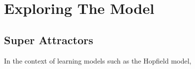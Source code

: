 \chapter{Exploring The Model}

\section{Super Attractors}
In the context of learning models such as the Hopfield model,